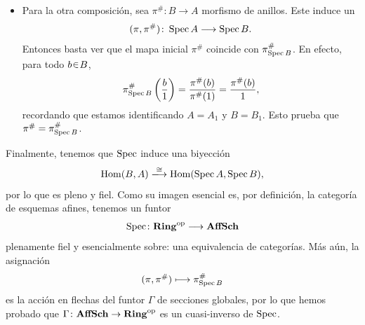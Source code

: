 \begin{sol}
\begin{itemize}
\item Para la otra composición, sea $\pi^\#\colon B\to A$ morfismo de anillos. Este induce un
\[
(\pi,\pi^\#)\colon\operatorname{Spec} A\longrightarrow\operatorname{Spec} B.
\]
Entonces basta ver que el mapa inicial $\pi^\#$ coincide con $\pi^\#_{\operatorname{Spec} B}$. En efecto, para todo $b\en B$,
\[
\pi^\#_{\operatorname{Spec} B}\left(\frac{b}{1}\right)
=\frac{\pi^\#(b)}{\pi^\#(1)}=\frac{\pi^\#(b)}{1},
\]
recordando que estamos identificando $A=A_1$ y $B=B_1$. Esto prueba que $\pi^\#=\pi^\#_{\operatorname{Spec} B}$.
\end{itemize}
Finalmente, tenemos que $\operatorname{Spec}$ induce una biyección
\[
\Hom(B,A)\xlongrightarrow{\cong}\Hom(\Spec A,\Spec B),
\]
por lo que es pleno y fiel. Como su imagen esencial es, por definición, la categoría de esquemas afines, tenemos un funtor
\[
\operatorname{Spec}\colon\mathbf{Ring}^{\mathrm{op}}\longrightarrow\mathbf{AffSch}
\]
plenamente fiel y esencialmente sobre: una equivalencia de categorías. Más aún, la asignación
\[
(\pi,\pi^\#)\longmapsto\pi^\#_{\operatorname{Spec} B}
\]
es la acción en flechas del funtor $\Gamma$ de secciones globales, por lo que hemos probado que $\Gamma\colon\mathbf{AffSch}\to\mathbf{Ring}^{\mathrm{op}}$ es un cuasi-inverso de $\operatorname{Spec}$.
\end{sol}
